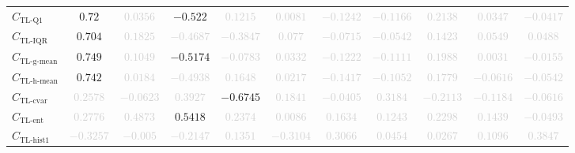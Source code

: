 \documentclass{standalone}
\newcommand{\tlqonename}{\text{TL-Q1}}
\newcommand{\tlqone}{C_{\tlqonename}}
\newcommand{\tliqrname}{\text{TL-IQR}}
\newcommand{\tliqr}{C_{\tliqrname}}
\newcommand{\tlgmeanname}{\text{TL-g-mean}}
\newcommand{\tlgmean}{C_{\tlgmeanname}}
\newcommand{\tlhmeanname}{\text{TL-h-mean}}
\newcommand{\tlhmean}{C_{\tlhmeanname}}
\newcommand{\tlcvariationname}{\text{TL-cvar}}
\newcommand{\tlcvariation}{C_{\tlcvariationname}}
\newcommand{\tlentropyname}{\text{TL-ent}}
\newcommand{\tlentropy}{C_{\tlentropyname}}
\newcommand{\tlhistonename}{\text{TL-hist1}}
\newcommand{\tlhistone}{C_{\tlhistonename}}
\begin{document}
\begin{tabular}{lcccccccccc}
$\tlqone$ & $0.72$ & \textcolor{lightgray}{$0.0356$} & $-0.522$ & \textcolor{lightgray}{$0.1215$} & \textcolor{lightgray}{$0.0081$} & \textcolor{lightgray}{$-0.1242$} & \textcolor{lightgray}{$-0.1166$} & \textcolor{lightgray}{$0.2138$} & \textcolor{lightgray}{$0.0347$} & \textcolor{lightgray}{$-0.0417$} \\ 
$\tliqr$ & $0.704$ & \textcolor{lightgray}{$0.1825$} & \textcolor{lightgray}{$-0.4687$} & \textcolor{lightgray}{$-0.3847$} & \textcolor{lightgray}{$0.077$} & \textcolor{lightgray}{$-0.0715$} & \textcolor{lightgray}{$-0.0542$} & \textcolor{lightgray}{$0.1423$} & \textcolor{lightgray}{$0.0549$} & \textcolor{lightgray}{$0.0488$} \\ 
$\tlgmean$ & $0.749$ & \textcolor{lightgray}{$0.1049$} & $-0.5174$ & \textcolor{lightgray}{$-0.0783$} & \textcolor{lightgray}{$0.0332$} & \textcolor{lightgray}{$-0.1222$} & \textcolor{lightgray}{$-0.1111$} & \textcolor{lightgray}{$0.1988$} & \textcolor{lightgray}{$0.0031$} & \textcolor{lightgray}{$-0.0155$} \\ 
$\tlhmean$ & $0.742$ & \textcolor{lightgray}{$0.0184$} & \textcolor{lightgray}{$-0.4938$} & \textcolor{lightgray}{$0.1648$} & \textcolor{lightgray}{$0.0217$} & \textcolor{lightgray}{$-0.1417$} & \textcolor{lightgray}{$-0.1052$} & \textcolor{lightgray}{$0.1779$} & \textcolor{lightgray}{$-0.0616$} & \textcolor{lightgray}{$-0.0542$} \\ 
$\tlcvariation$ & \textcolor{lightgray}{$0.2578$} & \textcolor{lightgray}{$-0.0623$} & \textcolor{lightgray}{$0.3927$} & $-0.6745$ & \textcolor{lightgray}{$0.1841$} & \textcolor{lightgray}{$-0.0405$} & \textcolor{lightgray}{$0.3184$} & \textcolor{lightgray}{$-0.2113$} & \textcolor{lightgray}{$-0.1184$} & \textcolor{lightgray}{$-0.0616$} \\ 
$\tlentropy$ & \textcolor{lightgray}{$0.2776$} & \textcolor{lightgray}{$0.4873$} & $0.5418$ & \textcolor{lightgray}{$0.2374$} & \textcolor{lightgray}{$0.0086$} & \textcolor{lightgray}{$0.1634$} & \textcolor{lightgray}{$0.1243$} & \textcolor{lightgray}{$0.2298$} & \textcolor{lightgray}{$0.1439$} & \textcolor{lightgray}{$-0.0493$} \\ 
$\tlhistone$ & \textcolor{lightgray}{$-0.3257$} & \textcolor{lightgray}{$-0.005$} & \textcolor{lightgray}{$-0.2147$} & \textcolor{lightgray}{$0.1351$} & \textcolor{lightgray}{$-0.3104$} & \textcolor{lightgray}{$0.3066$} & \textcolor{lightgray}{$0.0454$} & \textcolor{lightgray}{$0.0267$} & \textcolor{lightgray}{$0.1096$} & \textcolor{lightgray}{$0.3847$} \\ 

\end{tabular}
\end{document}
